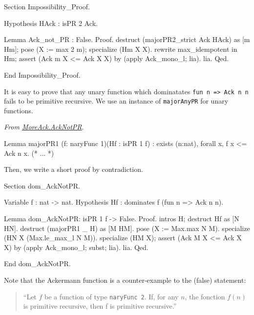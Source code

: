 \begin{Coqsrc}
Section Impossibility_Proof.

  Hypothesis HAck : isPR 2 Ack.
  
  Lemma Ack_not_PR : False.
  Proof.
    destruct (majorPR2_strict Ack HAck) as [m Hm];
    pose (X := max 2 m); specialize (Hm X X).
    rewrite max_idempotent in Hm; 
    assert (Ack m X <= Ack X X) by (apply Ack_mono_l; lia).
    lia.
  Qed.

End Impossibility_Proof.
\end{Coqsrc}


\begin{remark}
It is easy to prove that any unary function which dominatates \texttt{fun n => Ack n n} fails to be primitive recursive. We use an instance of \texttt{majorAnyPR} for unary functions.
\vspace{4pt}
\noindent

\emph{From \href{../theories/html/hydras.MoreAck.AckNotPR.html}{MoreAck.AckNotPR}}.
\begin{Coqsrc}
Lemma majorPR1  (f: naryFunc 1)(Hf : isPR 1 f)
  : exists (n:nat), forall x, f x <= Ack n x.
(* ... *)
\end{Coqsrc}

Then, we write  a short proof by contradiction.

\begin{Coqsrc}
Section dom_AckNotPR.

  Variable f : nat -> nat.
  Hypothesis Hf : dominates f (fun n => Ack n n).

 Lemma dom_AckNotPR: isPR 1 f -> False.
  Proof.
    intros H;  destruct Hf as [N HN].
    destruct  (majorPR1 _ H) as [M HM].
    pose (X := Max.max N M).
    specialize (HN X  (Max.le_max_l N M)).
    specialize (HM X);
      assert (Ack M X <= Ack X X) by (apply Ack_mono_l; subst; lia).
    lia.
  Qed.

End dom_AckNotPR.
\end{Coqsrc}
\end{remark}

\begin{remark}
Note that the Ackermann function is a counter-example to the (false) statement:
\begin{quote}
{\color{red}
  ``Let $f$ be a function of type \texttt{naryFunc\,2}. If, for any $n$, the fonction $f(n)$ is primitive recursive, then f is primitive recursive.''}
\end{quote}
\end{remark}




